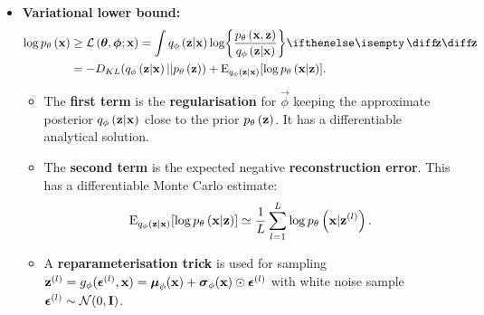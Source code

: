 \begin{itemize}
	\item \textbf{Variational lower bound:}
		\begin{gather*}
			\begin{split}
				\log \dec{\vec{x}} & \ge \mathcal{L}\left(\vec{\theta},\vec{\phi};\vec{x}\right) =
				\int \enc{\vec{z}|\vec{x}} \log \curlies*{ \frac{\dec{\vec{x},\vec{z}}}{\enc{\vec{z}|\vec{x}} } } \D{\vec{z}} \\
				& = -D_{KL}\parens{ \enc{\vec{z}|\vec{x}}||\dec{\vec{z}} } + \E_{\enc{\vec{z}|\vec{x}}} \brackets*{\log \dec{\vec{x}|\vec{z}}} .
			\end{split}
		\end{gather*}
	\begin{itemize}
		\item The \textbf{first term} is the \textbf{regularisation} for $\vec{\phi}$ keeping the approximate posterior $q_{\phi}\left(\bm{\mathrm{z}}|\bm{\mathrm{x}}\right)$ close to the prior $p_{\theta}\left(\bm{\mathrm{z}}\right)$. It has a differentiable analytical solution.
		\item The \textbf{second term} is the expected negative \textbf{reconstruction error}. This has a differentiable Monte Carlo estimate:
		\begin{equation*}
			\operatorname{E}_{q_{\phi}\left(\bm{\mathrm{z}}|\bm{\mathrm{x}}\right)} [\log p_{\theta}\left(\bm{\mathrm{x}}|\bm{\mathrm{z}}\right) ] \simeq \frac{1}{L}\sum^L_{l=1} \log p_{\theta}\left(\bm{\mathrm{x}}|\bm{\mathrm{z}}^{(l)}\right).
		\end{equation*}
		\item A \textbf{reparameterisation trick} is used for sampling $\bm{\mathrm{z}}^{(l)}= g_\phi (\bm{\mathrm{\epsilon}}^{(l)}, \bm{\mathrm{x}})= \bm{\mathrm{\mu}}_\phi(\bm{\mathrm{x}}) + \bm{\mathrm{\sigma}}_\phi(\bm{\mathrm{x}}) \odot \bm{\mathrm{\epsilon}}^{(l)}$ with white noise sample $\bm{\mathrm{\epsilon}}^{(l)} \sim \mathcal{N}(0,\bm{\mathrm{I}})$.
		\end{itemize}
	
\end{itemize}



